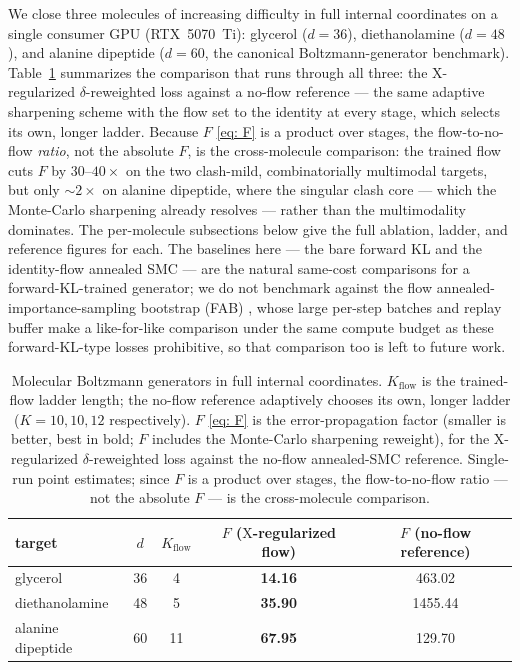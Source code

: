 \documentclass[11pt]{article}
\providecommand{\X}{\mathrm{X}}
\begin{document}
We close three molecules of increasing difficulty in full internal coordinates on a single consumer GPU
(RTX~5070~Ti): glycerol ($d = 36$), diethanolamine ($d = 48$), and alanine dipeptide ($d = 60$, the canonical
Boltzmann-generator benchmark). Table~\ref{tab: overview} summarizes the comparison that runs through all
three: the $\X$-regularized $\delta$-reweighted loss against a no-flow reference --- the same adaptive
sharpening scheme with the flow set to the identity at every stage, which selects its own, longer ladder.
Because $F$ \eqref{eq: F} is a product over stages, the flow-to-no-flow \emph{ratio}, not the absolute $F$, is
the cross-molecule comparison: the trained flow cuts $F$ by $30$--$40\times$ on the two clash-mild,
combinatorially multimodal targets, but only ${\sim}2\times$ on alanine dipeptide, where the singular clash
core --- which the Monte-Carlo sharpening already resolves --- rather than the multimodality dominates. The
per-molecule subsections below give the full ablation, ladder, and reference figures for each. The baselines
here --- the bare forward KL and the identity-flow annealed SMC --- are the natural same-cost comparisons for
a forward-KL-trained generator; we do not benchmark against the flow annealed-importance-sampling bootstrap
(FAB) \citep{midgley2022flow}, whose large per-step batches and replay buffer make a like-for-like comparison
under the same compute budget as these forward-KL-type losses prohibitive, so that comparison too is left to
future work.

\begin{table}[h]
    \centering
    \begin{tabular}{@{}lcccc@{}}
        \toprule
        target & $d$ & $K_{\mathrm{flow}}$ & $F$ ($\X$-regularized flow) & $F$ (no-flow reference) \\
        \midrule
        glycerol            & 36 & 4  & \textbf{14.16} & 463.02 \\
        diethanolamine      & 48 & 5  & \textbf{35.90} & 1455.44 \\
        alanine dipeptide   & 60 & 11 & \textbf{67.95} & 129.70 \\
        \bottomrule
    \end{tabular}
    \caption{Molecular Boltzmann generators in full internal coordinates. $K_{\mathrm{flow}}$ is the
    trained-flow ladder length; the no-flow reference adaptively chooses its own, longer ladder
    ($K = 10, 10, 12$ respectively). $F$ \eqref{eq: F} is the error-propagation factor (smaller is better,
    best in bold; $F$ includes the Monte-Carlo sharpening reweight), for the $\X$-regularized
    $\delta$-reweighted loss against the no-flow annealed-SMC reference. Single-run point estimates; since $F$
    is a product over stages, the flow-to-no-flow ratio --- not the absolute $F$ --- is the cross-molecule
    comparison.}
    \label{tab: overview}
\end{table}
\end{document}
